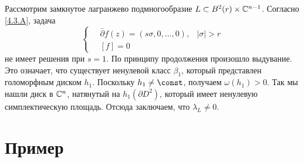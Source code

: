 Рассмотрим замкнутое лагранжево подмногообразие $L \subset B^2 (r) \times \mathbb{C}^{n-1}$.
Согласно \ref{4.3.A}, задача
\[
\begin{cases}
\quad\bar\partial f(z)=(s\sigma,0,\dots,0),&|\sigma|>r
\\
\quad[f]=0
\end{cases}
\]
не имеет решения при $s = 1$.
По принципу продолжения произошло выдувание.
Это означает, что существует ненулевой класс $\beta_1$, который представлен голоморфным диском $h_1$.
Поскольку $h_1 \z\ne \const$, получаем $\omega (h_1)> 0$.
Так мы нашли диск в $\mathbb{C}^n$, натянутый на $h_1 (\partial D^2)$, который имеет ненулевую симплектическую площадь.
Отсюда заключаем, что $\lambda_L \ne 0$.
\qeds

\section{Пример}\label{sec:4.4}

